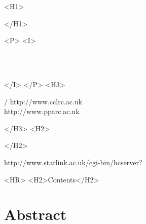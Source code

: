 \begin{htmlonly}
   \xlabel{}
   \begin{rawhtml} <H1> \end{rawhtml}
      \stardoctitle
   \begin{rawhtml} </H1> \end{rawhtml}


   \begin{rawhtml} <P> <I> \end{rawhtml}
   \stardoccategory \stardocnumber \\
   \stardocauthors \\
   \stardocdate
   \begin{rawhtml} </I> </P> <H3> \end{rawhtml}
       /
                        {http://www.cclrc.ac.uk} \\
                        {http://www.pparc.ac.uk} \\
   \begin{rawhtml} </H3> <H2> \end{rawhtml}
   \begin{rawhtml} </H2> \end{rawhtml}
      {http://www.starlink.ac.uk/cgi-bin/hcserver?\stardocsource}\\

  \label{stardoccontents}
  \begin{rawhtml} 
    <HR>
    <H2>Contents</H2>
  \end{rawhtml}
  \renewcommand{\latexonlytoc}[0]{}

  \section{Abstract}

\end{htmlonly}


